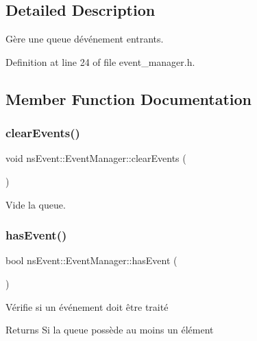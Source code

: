 \subsection{Detailed Description}
Gère une queue d\textquotesingle{}événement entrants. 

Definition at line 24 of file event\+\_\+manager.\+h.



\subsection{Member Function Documentation}
\mbox{\label{classns_event_1_1_event_manager_adbc5ced9a9435f61f58436ff613632b4}} 
\subsubsection{\texorpdfstring{clear\+Events()}{clearEvents()}}
{\footnotesize\ttfamily void ns\+Event\+::\+Event\+Manager\+::clear\+Events (\begin{DoxyParamCaption}{ }\end{DoxyParamCaption})}



Vide la queue. 

\mbox{\label{classns_event_1_1_event_manager_a5a3119d969a296b8e94f223171fdf2e6}} 
\subsubsection{\texorpdfstring{has\+Event()}{hasEvent()}}
{\footnotesize\ttfamily bool ns\+Event\+::\+Event\+Manager\+::has\+Event (\begin{DoxyParamCaption}{ }\end{DoxyParamCaption})}



Vérifie si un événement doit être traité 

\begin{DoxyReturn}{Returns}
Si la queue possède au moins un élément 
\end{DoxyReturn}
\mbox{\label{classns_event_1_1_event_manager_ac37f8ed34ab7c874ff28af7dccc035f3}} 

